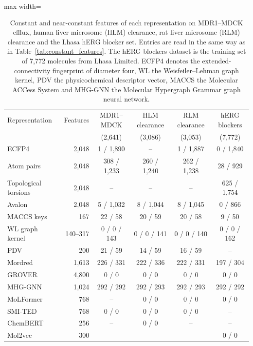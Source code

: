 \begin{table}[htbp]
\centering
\small
\setlength{\tabcolsep}{4pt}
\caption[Constant and near-constant features per representation, part 2.]{Constant and near-constant features of each representation on MDR1--MDCK efflux, human liver microsome (HLM) clearance, rat liver microsome (RLM) clearance and the Lhasa hERG blocker set. Entries are read in the same way as in Table~\ref{tab:constant_features}. The hERG blockers dataset is the training set of 7,772 molecules from Lhasa Limited. ECFP4 denotes the extended-connectivity fingerprint of diameter four, WL the Weisfeiler--Lehman graph kernel, PDV the physicochemical descriptor vector, MACCS the Molecular ACCess System and MHG-GNN the Molecular Hypergraph Grammar graph neural network.}
\label{tab:constant_features_b}
\begin{adjustbox}{max width=\textwidth}
\begin{tabular}{lrcccc}
\toprule
Representation & Features & MDR1--MDCK & HLM clearance & RLM clearance & hERG blockers \\
 & & (2,641) & (3,086) & (3,053) & (7,772) \\
\midrule
ECFP4 & 2,048 & 1 / 1,890 & -- & 1 / 1,887 & 0 / 1,840 \\
Atom pairs & 2,048 & 308 / 1,233 & 260 / 1,240 & 262 / 1,238 & 28 / 929 \\
Topological torsions & 2,048 & -- & -- & -- & 625 / 1,754 \\
Avalon & 2,048 & 5 / 1,032 & 8 / 1,044 & 8 / 1,045 & 0 / 866 \\
MACCS keys & 167 & 22 / 58 & 20 / 59 & 20 / 58 & 9 / 50 \\
WL graph kernel & 140--317 & 0 / 0 / 143 & 0 / 0 / 141 & 0 / 0 / 140 & 0 / 0 / 162 \\
PDV & 200 & 21 / 59 & 14 / 59 & 16 / 59 & -- \\
Mordred & 1,613 & 226 / 331 & 222 / 336 & 222 / 331 & 197 / 304 \\
GROVER & 4,800 & 0 / 0 & 0 / 0 & 0 / 0 & 0 / 0 \\
MHG-GNN & 1,024 & 292 / 292 & 292 / 293 & 292 / 293 & 292 / 292 \\
MoLFormer & 768 & -- & 0 / 0 & 0 / 0 & 0 / 0 \\
SMI-TED & 768 & 0 / 0 & 0 / 0 & 0 / 0 & -- \\
ChemBERT & 256 & -- & 0 / 0 & -- & -- \\
Mol2vec & 300 & -- & -- & -- & 0 / 0 \\
\bottomrule
\end{tabular}
\end{adjustbox}
\end{table}

